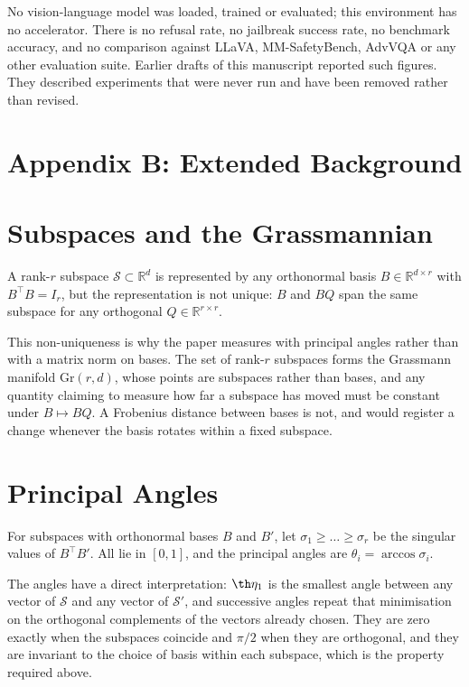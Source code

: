 \documentclass[10pt,journal,compsoc,twocolumn]{IEEEtran}
\begin{document}
No vision-language model was loaded, trained or evaluated; this environment has no accelerator. There is no refusal rate, no jailbreak success rate, no benchmark accuracy, and no comparison against LLaVA, MM-SafetyBench, AdvVQA or any other evaluation suite. Earlier drafts of this manuscript reported such figures. They described experiments that were never run and have been removed rather than revised.




\section{Appendix B: Extended Background}



\section{Subspaces and the Grassmannian}


A rank-$r$ subspace $\mathcal{S} \subset \mathbb{R}^{d}$ is represented by any orthonormal basis $B \in \mathbb{R}^{d \times r}$ with $B^{\top}B = I_r$, but the representation is not unique: $B$ and $BQ$ span the same subspace for any orthogonal $Q \in \mathbb{R}^{r \times r}$.

This non-uniqueness is why the paper measures with principal angles rather than with a matrix norm on bases. The set of rank-$r$ subspaces forms the Grassmann manifold $\mathrm{Gr}(r, d)$, whose points are subspaces rather than bases, and any quantity claiming to measure how far a subspace has moved must be constant under $B \mapsto BQ$. A Frobenius distance between bases is not, and would register a change whenever the basis rotates within a fixed subspace.


\section{Principal Angles}


For subspaces with orthonormal bases $B$ and $B'$, let $\sigma_1 \ge \dots \ge \sigma_r$ be the singular values of $B^{\top}B'$. All lie in $[0, 1]$, and the principal angles are $\theta_i = \arccos \sigma_i$.

The angles have a direct interpretation: $\th\eta_1$ is the smallest angle between any vector of $\mathcal{S}$ and any vector of $\mathcal{S}'$, and successive angles repeat that minimisation on the orthogonal complements of the vectors already chosen. They are zero exactly when the subspaces coincide and $\pi/2$ when they are orthogonal, and they are invariant to the choice of basis within each subspace, which is the property required above.
\end{document}

